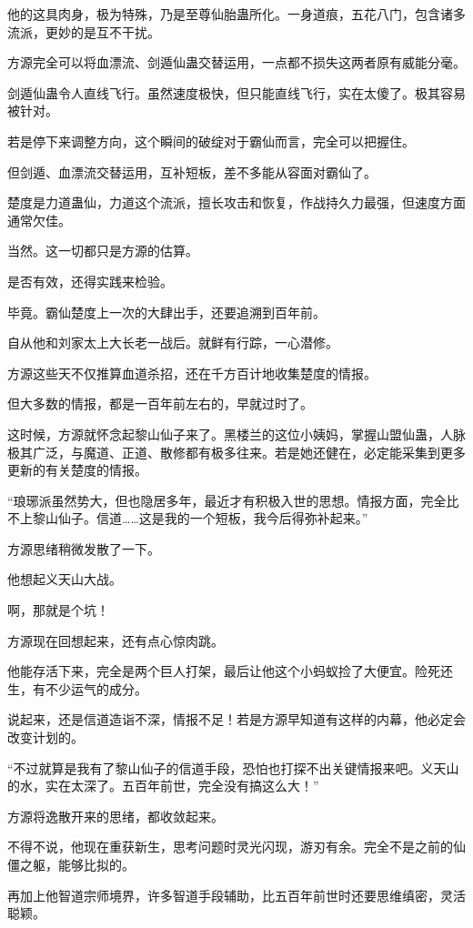 \begin{this_body}
他的这具肉身，极为特殊，乃是至尊仙胎蛊所化。一身道痕，五花八门，包含诸多流派，更妙的是互不干扰。

方源完全可以将血漂流、剑遁仙蛊交替运用，一点都不损失这两者原有威能分毫。

剑遁仙蛊令人直线飞行。虽然速度极快，但只能直线飞行，实在太傻了。极其容易被针对。

若是停下来调整方向，这个瞬间的破绽对于霸仙而言，完全可以把握住。

但剑遁、血漂流交替运用，互补短板，差不多能从容面对霸仙了。

楚度是力道蛊仙，力道这个流派，擅长攻击和恢复，作战持久力最强，但速度方面通常欠佳。

当然。这一切都只是方源的估算。

是否有效，还得实践来检验。

毕竟。霸仙楚度上一次的大肆出手，还要追溯到百年前。

自从他和刘家太上大长老一战后。就鲜有行踪，一心潜修。

方源这些天不仅推算血道杀招，还在千方百计地收集楚度的情报。

但大多数的情报，都是一百年前左右的，早就过时了。

这时候，方源就怀念起黎山仙子来了。黑楼兰的这位小姨妈，掌握山盟仙蛊，人脉极其广泛，与魔道、正道、散修都有极多往来。若是她还健在，必定能采集到更多更新的有关楚度的情报。

“琅琊派虽然势大，但也隐居多年，最近才有积极入世的思想。情报方面，完全比不上黎山仙子。信道……这是我的一个短板，我今后得弥补起来。”

方源思绪稍微发散了一下。

他想起义天山大战。

啊，那就是个坑！

方源现在回想起来，还有点心惊肉跳。

他能存活下来，完全是两个巨人打架，最后让他这个小蚂蚁捡了大便宜。险死还生，有不少运气的成分。

说起来，还是信道造诣不深，情报不足！若是方源早知道有这样的内幕，他必定会改变计划的。

“不过就算是我有了黎山仙子的信道手段，恐怕也打探不出关键情报来吧。义天山的水，实在太深了。五百年前世，完全没有搞这么大！”

方源将逸散开来的思绪，都收敛起来。

不得不说，他现在重获新生，思考问题时灵光闪现，游刃有余。完全不是之前的仙僵之躯，能够比拟的。

再加上他智道宗师境界，许多智道手段辅助，比五百年前世时还要思维缜密，灵活聪颖。


\end{this_body}
